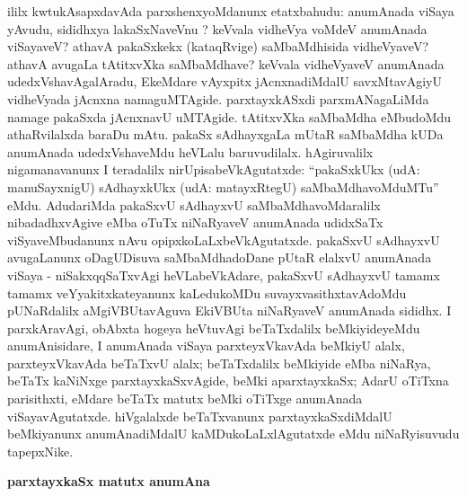 ililx kwtukAsapxdavAda parxshenxyoMdanunx etatxbahudu: anumAnada viSaya yAvudu, sididhxya lakaSxNaveVnu ? keVvala vidheVya voMdeV anumAnada viSayaveV? athavA pakaSxkekx (kataqRvige) saMbaMdhisida vidheVyaveV? athavA avugaLa tAtitxvXka saMbaMdhave? keVvala vidheVyaveV anumAnada udedxVshavAgalAradu, EkeMdare vAyxpitx jAcnxnadiMdalU savxMtavAgiyU vidheVyada jAcnxna namaguMTAgide. parxtayxkASxdi parxmANagaLiMda namage pakaSxda jAcnxnavU uMTAgide. tAtitxvXka saMbaMdha eMbudoMdu athaRvilalxda baraDu mAtu. pakaSx sAdhayxgaLa mUtaR saMbaMdha kUDa anumAnada udedxVshaveMdu heVLalu baruvudilalx. hAgiruvalilx nigamanavanunx I teradalilx nirUpisabeVkAgutatxde: ``pakaSxkUkx (udA: manuSayxnigU) sAdhayxkUkx (udA: matayxRtegU) saMbaMdhavoMduMTu'' eMdu. AdudariMda pakaSxvU sAdhayxvU saMbaMdhavoMdaralilx nibadadhxvAgive eMba oTuTx niNaRyaveV anumAnada udidxSaTx viSyaveMbudanunx nAvu opipxkoLaLxbeVkAgutatxde. pakaSxvU sAdhayxvU avugaLanunx oDagUDisuva saMbaMdhadoDane pUtaR elalxvU anumAnada viSaya - niSakxqqSaTxvAgi heVLabeVkAdare, pakaSxvU sAdhayxvU tamamx tamamx veYyakitxkateyanunx kaLedukoMDu suvayxvasithxtavAdoMdu pUNaRdalilx aMgiVBUtavAguva EkiVBUta niNaRyaveV anumAnada sididhx. I parxkAravAgi, obAbxta hogeya heVtuvAgi beTaTxdalilx beMkiyideyeMdu anumAnisidare, I anumAnada viSaya parxteyxVkavAda beMkiyU alalx, parxteyxVkavAda beTaTxvU alalx; beTaTxdalilx beMkiyide eMba niNaRya, beTaTx kaNiNxge parxtayxkaSxvAgide, beMki aparxtayxkaSx; AdarU oTiTxna parisithxti, eMdare beTaTx matutx beMki oTiTxge anumAnada viSayavAgutatxde. hiVgalalxde beTaTxvanunx parxtayxkaSxdiMdalU beMkiyanunx anumAnadiMdalU kaMDukoLaLxlAgutatxde eMdu niNaRyisuvudu tapepxNike.

\bigskip
\begin{center}
{\Large\bf parxtayxkaSx matutx anumAna}
\end{center}

